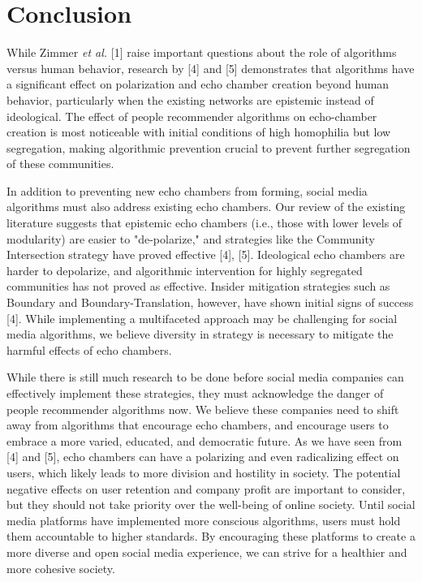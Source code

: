 \documentclass[10pt]{article}
\begin{document}
  \section{Conclusion}

\indent  

While Zimmer \textit{et al.} [1] raise important questions about the role of algorithms versus human behavior, research by [4] and [5] demonstrates that algorithms have a significant effect on polarization and echo chamber creation beyond human behavior, particularly when the existing networks are epistemic instead of ideological. The effect of people recommender algorithms on echo-chamber creation is most noticeable with initial conditions of high homophilia but low segregation, making algorithmic prevention crucial to prevent further segregation of these communities. 

In addition to preventing new echo chambers from forming, social media algorithms must also address existing echo chambers. Our review of the existing literature suggests that epistemic echo chambers (i.e., those with lower levels of modularity) are easier to "de-polarize,"  and strategies like the Community Intersection strategy have proved effective [4], [5]. 
Ideological echo chambers are harder to depolarize, and algorithmic intervention for highly segregated communities has not proved as effective. Insider mitigation strategies such as Boundary and Boundary-Translation, however, have shown initial signs of success [4]. While implementing a multifaceted approach may be challenging for social media algorithms, we believe diversity in strategy is necessary to mitigate the harmful effects of echo chambers.

While there is still much research to be done before social media companies can effectively implement these strategies, they must acknowledge the danger of people recommender algorithms now. We believe these companies need to shift away from algorithms that encourage echo chambers, and encourage users to embrace a more varied, educated, and democratic future. As we have seen from [4] and [5], echo chambers can have a polarizing and even radicalizing effect on users, which likely leads to more division and hostility in society. The potential negative effects on user retention and company profit are important to consider, but they should not take priority over the well-being of online society. Until social media platforms have implemented more conscious algorithms, users must hold them accountable to higher standards. By encouraging these platforms to create a more diverse and open social media experience, we can strive for a healthier and more cohesive society. 
\end{document}

